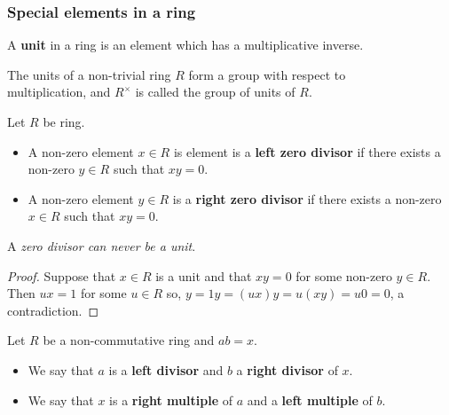 \documentclass[12pt, a4paper]{article}
\begin{document}

\subsubsection{Special elements in a ring}

\begin{definition}
    A \textbf{unit} in a ring is an element which has a multiplicative inverse.
\end{definition}

\begin{proposition}
    The units of a non-trivial ring \(R\) form a group with respect to \\ multiplication, and \(R^{\times}\) is called the group of units of \(R\). 
\end{proposition}

\begin{definition}
    Let \(R\) be ring.
    \begin{itemize}
        \item A non-zero element \(x \in R\) is element is a \textbf{left zero divisor} if there exists a non-zero \(y \in R\) such that \(xy=0\). 
        \item A non-zero element \(y \in R\) is a \textbf{right zero divisor} if there exists a non-zero \(x \in R\) such that \(xy=0\).
    \end{itemize}
\end{definition}

\begin{mdremark}
    A \textit{zero divisor can never be a unit}.
    \begin{proof}
        Suppose that \(x \in R\) is a unit and that \(xy=0\) for some non-zero \(y \in R\). Then \(ux=1\) for some \(u \in R\) so, \(y=1y=(ux)y=u(xy)=u0=0\), a contradiction.
    \end{proof}
\end{mdremark}

\begin{definition}
    Let \(R\) be a non-commutative ring and \(ab=x\). 
    \begin{itemize}
        \item We say that \(a\) is a \textbf{left divisor} and \(b\) a \textbf{right divisor} of \(x\).
        \item We say that \(x\) is a \textbf{right multiple} of \(a\) and a \textbf{left multiple} of \(b\).
    \end{itemize}
\end{definition}
\end{document}
